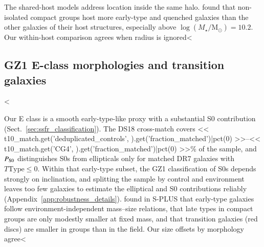 \documentclass{aa}
\newcommand{\CG}{CG\textsubscript{4}}
\newcommand{\msun}{\mathrm{M}_\odot}
\begin{document}
The shared-host models address location inside the same halo. \citet{Montaguth2026NonIsolated} found that non-isolated compact groups host more early-type and quenched galaxies than the other galaxies of their host structures, especially above \(\log(M_\star/\msun)=10.2\). Our within-host comparison agrees when radius is ignored<%

\subsection{GZ1 E-class morphologies and transition galaxies}\label{sec:s0_degeneracy}
<%

Our E class is a smooth early-type-like proxy with a substantial S0 contribution (Sect.~\ref{sec:ssfr_classification}). The DS18 cross-match covers << t10_match.get('deduplicated_controls', {}).get('fraction_matched')|pct(0) >>--<< t10_match.get('CG4', {}).get('fraction_matched')|pct(0) >>\% of the sample, and \(P_{\rm S0}\) distinguishes S0s from ellipticals only for matched DR7 galaxies with \(T\mathrm{Type}\leq0\). Within that early-type subset, the GZ1 classification of S0s depends strongly on inclination, and splitting the sample by control and environment leaves too few galaxies to estimate the elliptical and S0 contributions reliably (Appendix~\ref{app:robustness_details}). \citet{Montaguth2026MassSize} found in S-PLUS that early-type galaxies follow environment-independent mass--size relations, that late types in compact groups are only modestly smaller at fixed mass, and that transition galaxies (red discs) are smaller in groups than in the field. Our size offsets by morphology agree<%
\end{document}
